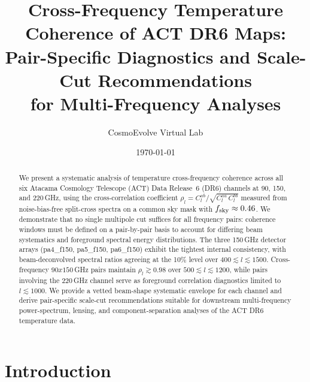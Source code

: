 \documentclass[twocolumn,showpacs,preprintnumbers,amsmath,amssymb,floatfix,prd]{revtex4-2}
\def\ell{l}%
\def\times{x}%
\begin{document}
\title{Cross-Frequency Temperature Coherence of ACT DR6 Maps:\\
Pair-Specific Diagnostics and Scale-Cut Recommendations\\
for Multi-Frequency Analyses}

\author{CosmoEvolve Virtual Lab}

\date{\today}

\begin{abstract}
We present a systematic analysis of temperature cross-frequency coherence
across all six Atacama Cosmology Telescope (ACT) Data Release~6 (DR6)
channels at 90, 150, and 220\,GHz, using the cross-correlation coefficient
$\rho_\ell = C_\ell^{ab}/\sqrt{C_\ell^{aa}\,C_\ell^{bb}}$ measured from
noise-bias-free split-cross spectra on a common sky mask with
$f_{\rm sky}\approx0.46$.  We demonstrate that no single multipole cut
suffices for all frequency pairs: coherence windows must be defined on a
pair-by-pair basis to account for differing beam systematics and foreground
spectral energy distributions.  The three 150\,GHz detector arrays
(pa4\_f150, pa5\_f150, pa6\_f150) exhibit the tightest internal consistency,
with beam-deconvolved spectral ratios agreeing at the 10\% level over
$400\lesssim\ell\lesssim1500$.  Cross-frequency $90\times150$\,GHz pairs
maintain $\rho_\ell\gtrsim0.98$ over $500\lesssim\ell\lesssim1200$, while
pairs involving the 220\,GHz channel serve as foreground correlation
diagnostics limited to $\ell\lesssim1000$.  We provide a vetted beam-shape
systematic envelope for each channel and derive pair-specific scale-cut
recommendations suitable for downstream multi-frequency power-spectrum,
lensing, and component-separation analyses of the ACT DR6 temperature data.
\end{abstract}


\maketitle

\section{Introduction}\label{sec:intro}
\end{document}
